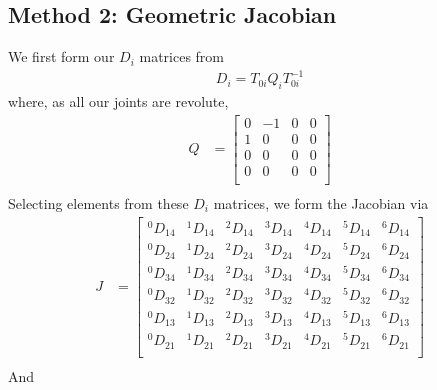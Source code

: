 \documentclass{article}
\begin{document}
\subsection{Method 2: Geometric Jacobian}
We first form our $D_i$ matrices from
\begin{align*}
D_i = T_{0i} Q_i T_{0i}^{-1}
\end{align*}
where, as all our joints are revolute,
\begin{align*}
Q &=
\left[\begin{matrix}
    0 & -1 & 0 & 0 \\
    1 &  0 & 0 & 0 \\
    0 &  0 & 0 & 0 \\
    0 &  0 & 0 & 0 \\
\end{matrix}\right] \\
\end{align*}
Selecting elements from these $D_i$ matrices, we form the Jacobian via
\begin{align*}
J &=
\left[\begin{matrix}
^0D_{14} & ^1D_{14} & ^2D_{14} & ^3D_{14} & ^4D_{14} & ^5D_{14} & ^6D_{14} \\
^0D_{24} & ^1D_{24} & ^2D_{24} & ^3D_{24} & ^4D_{24} & ^5D_{24} & ^6D_{24} \\
^0D_{34} & ^1D_{34} & ^2D_{34} & ^3D_{34} & ^4D_{34} & ^5D_{34} & ^6D_{34} \\
^0D_{32} & ^1D_{32} & ^2D_{32} & ^3D_{32} & ^4D_{32} & ^5D_{32} & ^6D_{32} \\
^0D_{13} & ^1D_{13} & ^2D_{13} & ^3D_{13} & ^4D_{13} & ^5D_{13} & ^6D_{13} \\
^0D_{21} & ^1D_{21} & ^2D_{21} & ^3D_{21} & ^4D_{21} & ^5D_{21} & ^6D_{21} \\
\end{matrix}\right] \\
\end{align*}
And
\end{document}
